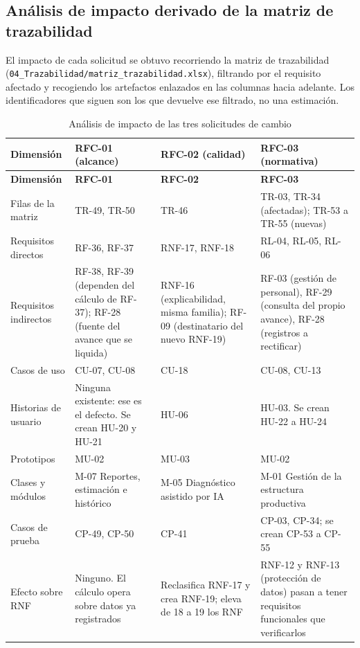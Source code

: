 \documentclass[11pt,letterpaper]{article}
\begin{document}
\subsection{Análisis de impacto derivado de la matriz de trazabilidad}

El impacto de cada solicitud se obtuvo recorriendo la matriz de trazabilidad
(\texttt{04\_Trazabilidad/matriz\_trazabilidad.xlsx}), filtrando por el requisito afectado y
recogiendo los artefactos enlazados en las columnas hacia adelante. Los identificadores que siguen
son los que devuelve ese filtrado, no una estimación.

{\footnotesize
\begin{longtable}{L{2.4cm} L{4.4cm} L{4.4cm} L{4.4cm}}
\caption{Análisis de impacto de las tres solicitudes de cambio}\\
\toprule
\textbf{Dimensión} & \textbf{RFC-01 (alcance)} & \textbf{RFC-02 (calidad)} & \textbf{RFC-03 (normativa)}\\
\midrule
\endfirsthead
\toprule
\textbf{Dimensión} & \textbf{RFC-01} & \textbf{RFC-02} & \textbf{RFC-03}\\
\midrule
\endhead
\bottomrule
\endfoot
Filas de la matriz & TR-49, TR-50 & TR-46 & TR-03, TR-34 (afectadas); TR-53 a TR-55 (nuevas)\\
Requisitos directos & RF-36, RF-37 & RNF-17, RNF-18 & RL-04, RL-05, RL-06\\
Requisitos indirectos & RF-38, RF-39 (dependen del cálculo de RF-37); RF-28 (fuente del avance que se liquida) & RNF-16 (explicabilidad, misma familia); RF-09 (destinatario del nuevo RNF-19) & RF-03 (gestión de personal), RF-29 (consulta del propio avance), RF-28 (registros a rectificar)\\
Casos de uso & CU-07, CU-08 & CU-18 & CU-08, CU-13\\
Historias de usuario & Ninguna existente: ese es el defecto. Se crean HU-20 y HU-21 & HU-06 & HU-03. Se crean HU-22 a HU-24\\
Prototipos & MU-02 & MU-03 & MU-02\\
Clases y módulos & M-07 Reportes, estimación e histórico & M-05 Diagnóstico asistido por IA & M-01 Gestión de la estructura productiva\\
Casos de prueba & CP-49, CP-50 & CP-41 & CP-03, CP-34; se crean CP-53 a CP-55\\
Efecto sobre RNF & Ninguno. El cálculo opera sobre datos ya registrados & Reclasifica RNF-17 y crea RNF-19; eleva de 18 a 19 los RNF & RNF-12 y RNF-13 (protección de datos) pasan a tener requisitos funcionales que verificarlos\\

\end{longtable}}
\end{document}
